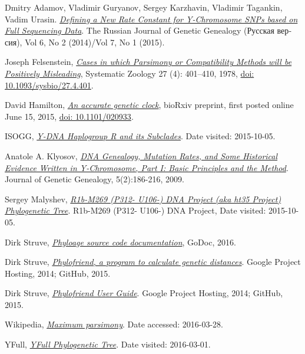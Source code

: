 \raggedright
\begin{thebibliography}{bla}

 Dmitry Adamov, Vladimir Guryanov,
Sergey Karzhavin, Vladimir Tagankin, Vadim Urasin.
\emph{\href{http://rjgg.molgen.org/index.php/RJGGRE/article/view/151}
{Defining a New Rate Constant for Y-Chromosome SNPs based on Full Sequencing Data}}.
The Russian Journal of Genetic Genealogy
(\foreignlanguage{russian}{Русская версия}),
Vol 6, No 2 (2014)/Vol 7, No 1 (2015).

 Joseph Felsenstein,
\emph{\href{http://sysbio.oxfordjournals.org/content/27/4/401}
{Cases in which Parsimony or Compatibility Methods will be Positively Misleading}},
Systematic Zoology 27 (4): 401--410, 1978,
\href{http://dx.doi.org/10.1093/sysbio/27.4.401}{doi: 10.1093/sysbio/27.4.401}.

 David Hamilton,
\emph{\href{http://biorxiv.org/content/early/2015/06/19/020933}
{An accurate genetic clock}},
bioRxiv preprint, first posted online June 15, 2015,
\href{http://dx.doi.org/10.1101/020933}{doi: 10.1101/020933}.

 ISOGG,
\emph{\href{http://www.isogg.org/tree/ISOGG_HapgrpR.html}
{Y-DNA Haplogroup R and its Subclades}}.
Date visited: 2015-10-05.

 Anatole A. Klyosov,
\emph{\href{http://www.jogg.info/52/files/Klyosov1.pdf}
{DNA Genealogy, Mutation Rates, and Some Historical
Evidence Written in Y-Chromosome, Part I:  Basic Principles and
the Method}}.
Journal of Genetic Genealogy, 5(2):186-216, 2009.

 Sergey Malyshev,
\emph{\href{https://www.familytreedna.com/groups/ht-3-5new/about/results}
{R1b-M269 (P312- U106-) DNA Project (aka ht35 Project) Phylogenetic Tree}}.
R1b-M269 (P312- U106-) DNA Project, Date visited: 2015-10-05.

 Dirk Struve,
\emph{\href{https://godoc.org/github.com/yogischogi/phyloage/phylotree}
{Phyloage source code documentation}}, GoDoc, 2016.

 Dirk Struve,
\emph{\href{https://github.com/yogischogi/phylofriend/}{Phylofriend,
a program to calculate genetic distances}}.
Google Project Hosting, 2014; GitHub, 2015.

 Dirk Struve,
\emph{\href{https://github.com/yogischogi/phylofriend/blob/master/doc/phylofriend.pdf?raw=true}
{Phylofriend User Guide}}.
Google Project Hosting, 2014; GitHub, 2015.

 Wikipedia,
\emph{\href{https://en.wikipedia.org/wiki/Maximum_parsimony_\%28phylogenetics\%29}
{Maximum parsimony}}.
Date accessed: 2016-03-28.

 YFull,
\emph{\href{http://yfull.com/tree/}{YFull Phylogenetic Tree}}.
Date visited: 2016-03-01.

\end{thebibliography}
